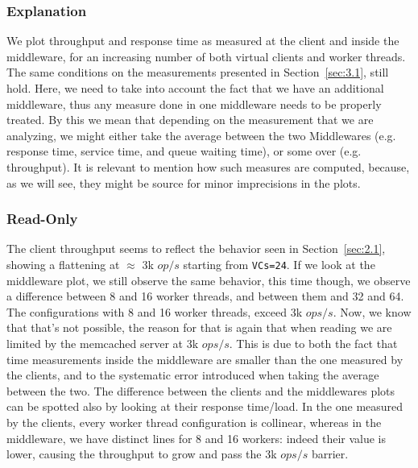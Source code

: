 \documentclass[11pt,a4paper]{article}
\begin{document}
\subsubsection{Explanation}

We plot throughput and response time as measured at the client and inside the middleware, for an increasing number of both virtual clients and  worker threads.\\
The same conditions on the measurements presented in Section~\ref{sec:3.1}, still hold. Here, we need to take into account the fact that we have an additional middleware, thus any measure done in one middleware needs to be properly treated. By this we mean that depending on the measurement that we are analyzing, we might either take the  average between the two Middlewares (e.g. response time, service time, and queue waiting time), or some over (e.g. throughput).
It is relevant to mention how such measures are computed, because, as we will see, they might be source for minor imprecisions in the plots.

\subsubsection*{Read-Only}

The client throughput seems to reflect the behavior seen in Section~\ref{sec:2.1}, showing a flattening at $\approx$ 3k $op/s$ starting from \texttt{VCs=24}. If we look at the middleware plot, we still observe the same behavior, this time though, we observe a difference between 8 and 16 worker threads, and between them and 32 and 64. The configurations with 8 and 16 worker threads, exceed 3k $ops/s$. Now, we know that that's not possible, the reason for that is again that when reading we are limited by the memcached server at 3k $ops/s$. This is due to both the fact that time measurements inside the middleware are smaller than the one measured by the clients, and to the systematic error introduced when taking the average between the two.
The difference between the clients and the middlewares plots can be spotted also by looking at their response time/load. In the one measured by the clients, every worker thread configuration is collinear, whereas in the middleware, we have distinct lines for 8 and 16 workers: indeed their value is lower, causing the throughput to grow and pass the 3k $ops/s$ barrier.
\end{document}
